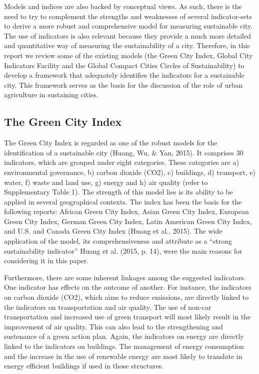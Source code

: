 Models and indices are also backed by conceptual views. As such, there is the need to try to complement the strengths and weaknesses of several indicator-sets to derive a more robust and comprehensive model for measuring sustainable city. The use of indicators is also relevant because they provide a much more detailed and quantitative way of measuring the sustainability of a city. Therefore, in this report we review some of the existing models (the Green City Index, Global City Indicators Facility and the Global Compact Cities Circles of Sustainability) to develop a framework that adequately identifies the indicators for a sustainable city. This framework serves as the basis for the discussion of the role of urban agriculture in sustaining cities.

\subsection{The Green City Index}

The Green City Index is regarded as one of the robust models for the identification of a sustainable city (Huang, Wu, \& Yan, 2015). It comprises 30 indicators, which are grouped under eight categories. These categories are a) environmental governance, b) carbon dioxide (CO2), c) buildings, d) transport, e) water, f) waste and land use, g) energy and h) air quality (refer to Supplementary Table 1). The strength of this model lies is its ability to be applied in several geographical contexts. The index has been the basis for the following reports: African Green City Index, Asian Green City Index, European Green City Index, German Green City Index, Latin American Green City Index, and U.S. and Canada Green City Index (Huang et al., 2015). The wide application of the model, its comprehensiveness and attribute as a “strong sustainability indicator” Huang et al. (2015, p. 14), were the main reasons for considering it in this paper.

Furthermore, there are some inherent linkages among the suggested indicators. One indicator has effects on the outcome of another. For instance, the indicators on carbon dioxide (CO2), which aims to reduce emissions, are directly linked to the indicators on transportation and air quality. The use of non-car transportation and increased use of green transport will most likely result in the improvement of air quality. This can also lead to the strengthening and sustenance of a green action plan. Again, the indicators on energy are directly linked to the indicators on buildings. The management of energy consumption and the increase in the use of renewable energy are most likely to translate in
energy efficient buildings if used in those structures.

